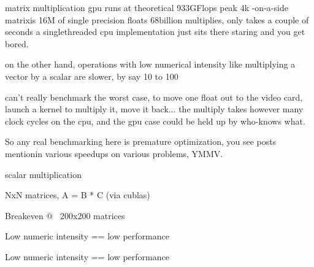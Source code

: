 \begin{frame}{matrix multiplication}
gpu runs at theoretical 933GFlops peak 4k -on-a-side matrixis 16M of
single precision floats 68billion multiplies, only takes a couple of
seconds a singlethreaded cpu implementation just sits there staring
and you get bored.

on the other hand, operations with low numerical intensity like
multiplying a vector by a scalar are slower, by say 10 to 100

can't really benchmark the worst case, to move one float out to the
video card, launch a kernel to multiply it, move it back... the
multiply takes however many clock cycles on the cpu, and the gpu case
could be held up by who-knows what.   

So any real benchmarking here is premature optimization, you see posts
mentionin various speedups on various problems, YMMV.  
\end{frame}

\begin{frame}{scalar multiplication}

\end{frame}

\begin{frame}{NxN matrices,   A = B * C  (via cublas)}


\end{frame}

\begin{frame}{Breakeven @  ~200x200 matrices}


\end{frame}

\begin{frame}{Low numeric intensity == low performance}


\end{frame}

\begin{frame}{Low numeric intensity == low performance}

  \note{
    
  }

\end{frame}

